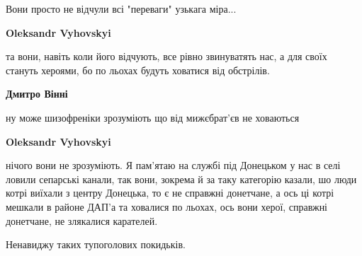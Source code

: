 \begin{itemize}
Вони просто не відчули всі "переваги" узькага міра...

\begin{itemize}
 
\textbf{Oleksandr Vyhovskyi} 

та вони, навіть коли його відчують, все рівно звинуватять нас, а для своїх
стануть хероями, бо по льохах будуть ховатися від обстрілів.

 
\textbf{Дмитро Вінні} 

ну може шизофреніки зрозуміють що від мижєбрат'єв не ховаються

 
\textbf{Oleksandr Vyhovskyi} 

нічого вони не зрозуміють. Я пам'ятаю на службі під Донецьком у нас в селі
ловили сепарські канали, так вони, зокрема й за таку категорію казали, шо люди
котрі виїхали з центру Донецька, то є не справжні донетчане, а ось ці котрі
мешкали в районе ДАП'а та ховалися по льохах, ось вони херої, справжні
донетчане, не злякалися карателей.

\end{itemize}

 
Ненавиджу таких тупоголових покидьків.

 


\end{itemize}
